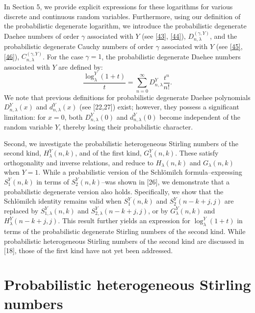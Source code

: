 \documentclass[a4paper,11pt]{amsart}
\begin{document}
In Section 5, we provide explicit expressions for these logarithms for various discrete and continuous random variables. Furthermore, using our definition of the probabilistic degenerate logarithm, we introduce the probabilistic degenerate Daehee numbers of order $\gamma$ associated with $Y$ (see \eqref{43}, \eqref{44}), $D_{n,\lambda}^{(\gamma,Y)}$, and the probabilistic degenerate Cauchy numbers of order $\gamma$ associated with $Y$ (see \eqref{45}, \eqref{46}), $C_{n,\lambda}^{(\gamma,Y)}$. For the case $\gamma=1$, the probabilistic degenerate Daehee numbers associated with $Y$ are defined by:
\begin{equation*}
\frac{\log_{\lambda}^{Y}(1+t)}{t}=\sum_{n=0}^{\infty}D_{n,\lambda}^{Y}\frac{t^{n}}{n!}.
\end{equation*}
We note that previous definitions for probabilistic degenerate Daehee polynomials $D_{n,\lambda}^{Y}(x)$ and $d_{n,\lambda}^{Y}(x)$ (see [22,27]) exist; however, they possess a significant limitation: for $x=0$, both $D_{n,\lambda}^{Y}(0)$ and $d_{n,\lambda}^{Y}(0)$ become independent of the random variable $Y$, thereby losing their probabilistic character.  \par
Second, we investigate the probabilistic heterogeneous Stirling numbers of the second kind, $H_{\lambda}^{Y}(n,k)$, and of the first kind, $G_{\lambda}^{Y}(n,k)$. These satisfy orthogonality and inverse relations, and reduce to $H_{\lambda}(n,k)$ and $G_{\lambda}(n,k)$ when $Y=1$. While a probabilistic version of the Schl\"omilch formula--expressing $S_{1}^{Y}(n,k)$ in terms of $S_{2}^{Y}(n,k)$--was shown in [26], we demonstrate that a probabilistic degenerate version also holds. Specifically, we show that the Schl\"omilch identity remains valid when $S_{1}^{Y}(n,k)$ and $S_{2}^{Y}(n-k+j,j)$ are replaced by $S_{1,\lambda}^{Y}(n,k)$ and $S_{2,\lambda}^{Y}(n-k+j,j)$, or by $G_{\lambda}^{Y}(n,k)$ and $H_{\lambda}^{Y}(n-k+j,j)$. This result further yields an expression for $\log_{\lambda}^{Y}(1+t)$ in terms of the probabilistic degenerate Stirling numbers of the second kind. While probabilistic heterogeneous Stirling numbers of the second kind are discussed in [18], those of the first kind have not yet been addressed. \par


\section{Probabilistic heterogeneous Stirling numbers}
\end{document}
